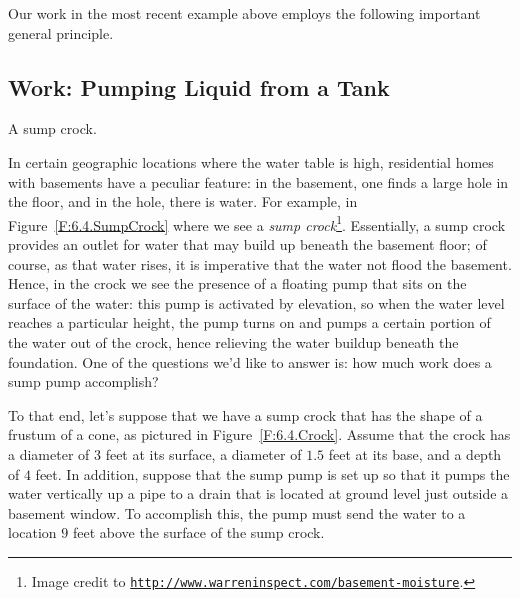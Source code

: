 Our work in the most recent example above employs the following important general principle.






\subsection*{Work: Pumping Liquid from a Tank}

\begin{marginfigure}[3cm] %
\caption{A sump crock.} \label{F:6.4.SumpCrock}
\end{marginfigure}

In certain geographic locations where the water table is high, residential homes with basements have a peculiar feature:  in the basement, one finds a large hole in the floor, and in the hole, there is water.  For example, in Figure~\ref{F:6.4.SumpCrock} 
where we see a \emph{sump crock}\footnote{Image credit to \href{http://www.warreninspect.com/basement-moisture}{\texttt{http://www.warreninspect.com/basement-moisture}}.}.  Essentially, a sump crock provides an outlet for water that may build up beneath the basement floor; of course, as that water rises, it is imperative that the water not flood the basement.  Hence, in the crock we see the presence of a floating pump that sits on the surface of the water:  this pump is activated by elevation, so when the water level reaches a particular height, the pump turns on and pumps a certain portion of the water out of the crock, hence relieving the water buildup beneath the foundation.  One of the questions we'd like to answer is:  how much work does a sump pump accomplish?

To that end, let's suppose that we have a sump crock that has the shape of a frustum of a cone, as pictured in Figure~\ref{F:6.4.Crock}.  Assume that the crock has a diameter of $3$ feet at its surface, a diameter of $1.5$ feet at its base, and a depth of $4$ feet.  In addition, suppose that the sump pump is set up so that it pumps the water vertically up a pipe to a drain that is located at ground level just outside a basement window.  To accomplish this, the pump must send the water to a location $9$ feet above the surface of the sump crock.

